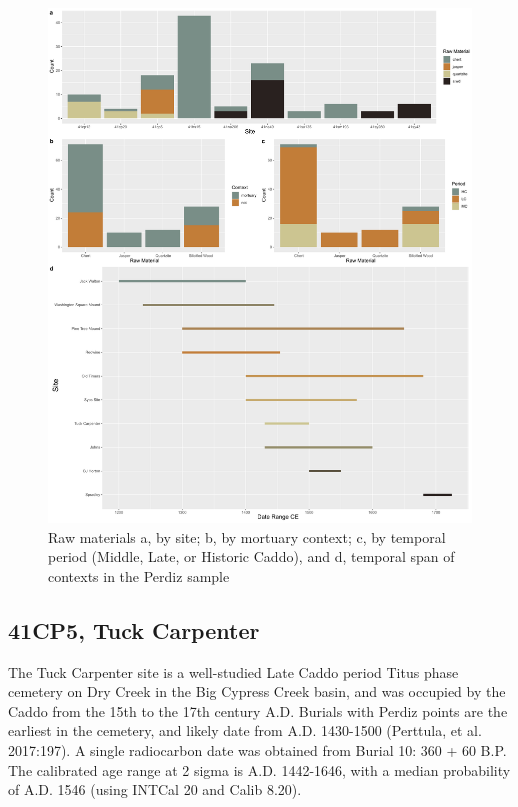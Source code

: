 \documentclass[review]{elsarticle}
\begin{document}
\begin{figure}[!]\centering
\includegraphics[width=\linewidth]{fig.mat.temp.pdf}
\caption{Raw materials a, by site; b, by mortuary context; c, by temporal period (Middle, Late, or Historic Caddo), and d, temporal span of contexts in the Perdiz sample}
\label{fig:raw.mat}
\end{figure}

\subsection*{41CP5, Tuck Carpenter}

The Tuck Carpenter site is a well-studied Late Caddo period Titus phase cemetery on Dry Creek in the Big Cypress Creek basin, and was occupied by the Caddo from the 15th to the 17th century A.D. Burials with Perdiz points are the earliest in the cemetery, and likely date from A.D. 1430-1500 (Perttula, et al. 2017:197). A single radiocarbon date was obtained from Burial 10: 360 + 60 B.P. The calibrated age range at 2 sigma is A.D. 1442-1646, with a median probability of A.D. 1546 (using INTCal 20 and Calib 8.20).
\end{document}

